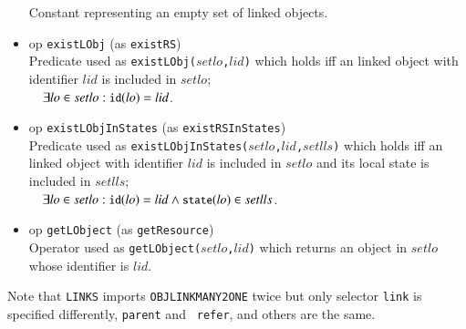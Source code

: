 \documentclass[12pt]{report}
\newcommand{\mbstt}[1]{\mbox{\small{\tt {#1}}}}
\newcommand{\stt}[1]{{\small{\tt {#1}}}}
\begin{document}
\begin{itemize}
  Constant representing an empty set of linked objects.
\item op \stt{existLObj} (as \stt{existRS})\\
  Predicate used as \stt{existLObj($setlo$,$lid$)} which holds iff an
  linked object with identifier $lid$ is included in
  $setlo$;\\$~~~~\exists lo\in setlo:\mbstt{id}(lo)=lid$.
\item op \stt{existLObjInStates} (as \stt{existRSInStates})\\
  Predicate used as \stt{existLObjInStates($setlo$,$lid$,$setlls$)}
  which holds iff an linked object with identifier $lid$ is included
  in $setlo$ and its local state is included in
  $setlls$;\\$~~~~\exists lo\in setlo:\mbstt{id}(lo)=lid\land
  \mbstt{state}(lo)\in setlls$.
\item op \stt{getLObject} (as \stt{getResource})\\
  Operator used as \stt{getLObject($setlo$,$lid$)} which returns an
  object in $setlo$ whose identifier is $lid$.
\end{itemize}
Note that {\tt LINKS} imports {\tt OBJLINKMANY2ONE} twice but only
selector {\tt link} is specified differently, {\tt parent} and {\tt
  refer}, and others are the same.
\end{document}
